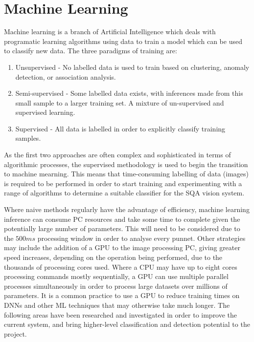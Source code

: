 \documentclass[fleqn,twoside,12pt]{report}
\begin{document}
\section{Machine Learning}

Machine learning is a branch of Artificial Intelligence which deals with programatic learning algorithms using data to train a model which can be used to classify new data. The three paradigms of training are:

\begin{enumerate}
	\item Unsupervised - No labelled data is used to train based on clustering, anomaly detection, or association analysis.
	\item Semi-supervised - Some labelled data exists, with inferences made from this small sample to a larger training set. A mixture of un-supervised and supervised learning.
	\item Supervised - All data is labelled in order to explicitly classify training samples.
\end{enumerate} 

As the first two approaches are often complex and sophisticated in terms of algorithmic processes, the supervised methodology is used to begin the transition to machine mearning. This means that time-consuming labelling of data (images) is required to be performed in order to start training and experimenting with a range of algorithms to determine a suitable classifier for the SQA vision system.

Where naive methods regularly have the advantage of efficiency, machine learning inference can consume PC resources and take some time to complete given the potentially large number of parameters. This will need to be considered due to the $500ms$ processing window in order to analyse every punnet. Other strategies may include the addition of a GPU to the image processing PC, giving greater speed increases, depending on the operation being performed, due to the thousands of processing cores used. Where a CPU may have up to eight cores processing commands mostly sequentially, a GPU can use  multiple parallel processes simultaneously in order to process large datasets over millions of parameters. It is a common practice to use a GPU to reduce training times on DNNs and other ML techniques that may otherwise take much longer. The following areas have been researched and investigated in order to improve the current system, and bring higher-level classification and detection potential to the project.
\end{document}

